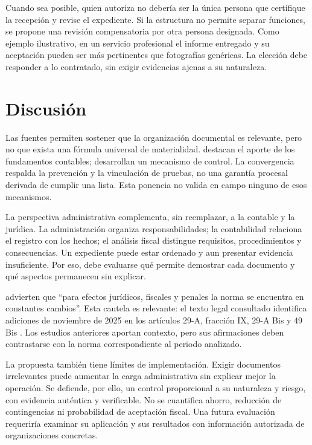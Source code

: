Cuando sea posible, quien autoriza no debería ser la única persona que
certifique la recepción y revise el expediente. Si la estructura no permite
separar funciones, se propone una revisión compensatoria por otra persona
designada. Como ejemplo ilustrativo, en un servicio profesional el informe
entregado y su aceptación pueden ser más pertinentes que fotografías
genéricas. La elección debe responder a lo contratado, sin exigir evidencias
ajenas a su naturaleza.

\section{Discusión}

Las fuentes permiten sostener que la organización documental es relevante,
pero no que exista una fórmula universal de materialidad.
\textcite{arrona2022certeza} destacan el aporte de los fundamentos contables;
\textcite{rico2023mecanismo} desarrollan un mecanismo de control. La
convergencia respalda la prevención y la vinculación de pruebas, no una
garantía procesal derivada de cumplir una lista. Esta ponencia no valida en
campo ninguno de esos mecanismos.

La perspectiva administrativa complementa, sin reemplazar, a la contable y
la jurídica. La administración organiza responsabilidades; la contabilidad
relaciona el registro con los hechos; el análisis fiscal distingue requisitos,
procedimientos y consecuencias. Un expediente puede estar ordenado y aun
presentar evidencia insuficiente. Por eso, debe evaluarse qué permite
demostrar cada documento y qué aspectos permanecen sin explicar.

\textcite[p. 67]{rico2024consecuencias} advierten que
\enquote{para efectos jurídicos, fiscales y penales la norma se encuentra en
constantes cambios}. Esta cautela es relevante: el texto legal consultado
identifica adiciones de noviembre de 2025 en los artículos 29-A, fracción IX,
29-A Bis y 49 Bis \parencite[arts. 29-A, 29-A Bis y 49 Bis]{cff2026}.
Los estudios anteriores aportan contexto, pero sus afirmaciones deben
contrastarse con la norma correspondiente al periodo analizado.

La propuesta también tiene límites de implementación. Exigir documentos
irrelevantes puede aumentar la carga administrativa sin explicar mejor la
operación. Se defiende, por ello, un control proporcional a su naturaleza y
riesgo, con evidencia auténtica y verificable. No se cuantifica ahorro,
reducción de contingencias ni probabilidad de aceptación fiscal. Una futura
evaluación requeriría examinar su aplicación y sus resultados con información
autorizada de organizaciones concretas.

